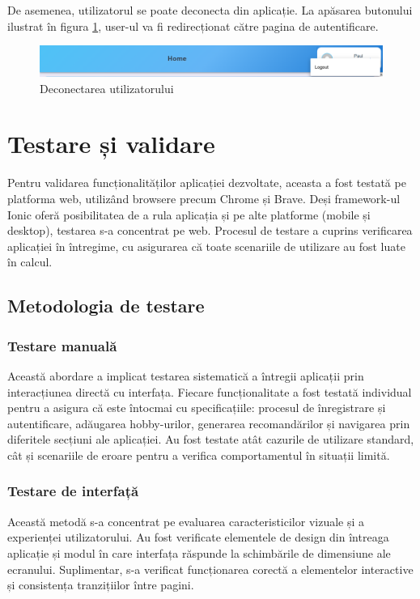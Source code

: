 \par
De asemenea, utilizatorul se poate deconecta din aplicație. La apăsarea butonului ilustrat în figura \ref{FigLogoutButton}, user-ul va fi redirecționat către pagina de autentificare.

\begin{figure}[htbp]
	\centering
    \includegraphics[scale=0.35]{./figures/logout-component.png}
	\caption{Deconectarea utilizatorului}
	\label{FigLogoutButton}
\end{figure}

\section{Testare și validare}
\label{sec:ch4sec4}
Pentru validarea funcționalităților aplicației dezvoltate, aceasta a fost testată pe platforma web, utilizând browsere precum Chrome și Brave.
Deși framework-ul Ionic oferă posibilitatea de a rula aplicația și pe alte platforme (mobile și desktop), testarea s-a concentrat pe web.
Procesul de testare a cuprins verificarea aplicației în întregime, cu asigurarea că toate scenariile de utilizare au fost luate în calcul. 

\subsection{Metodologia de testare}
\label{subsec:ch4sec4sub1}
\subsubsection*{Testare manuală}
Această abordare a implicat testarea sistematică a întregii aplicații prin interacțiunea directă cu interfața.
Fiecare funcționalitate a fost testată individual pentru a asigura că este întocmai cu specificațiile: procesul de înregistrare și autentificare, adăugarea hobby-urilor, generarea recomandărilor și navigarea prin diferitele secțiuni ale aplicației.
Au fost testate atât cazurile de utilizare standard, cât și scenariile de eroare pentru a verifica comportamentul în situații limită.
\subsubsection*{Testare de interfață}
Această metodă s-a concentrat pe evaluarea caracteristicilor vizuale și a experienței utilizatorului.
Au fost verificate elementele de design din întreaga aplicație și modul în care interfața răspunde la schimbările de dimensiune ale ecranului.
Suplimentar, s-a verificat funcționarea corectă a elementelor interactive și consistența tranzițiilor între pagini.

